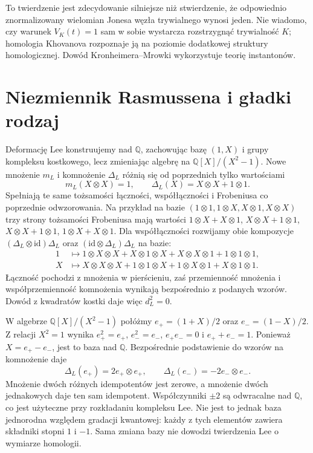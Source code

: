 \begin{uwaga}
To twierdzenie jest zdecydowanie silniejsze niż
stwierdzenie, że odpowiednio znormalizowany wielomian
Jonesa węzła trywialnego wynosi jeden. Nie wiadomo,
czy warunek $V_K(t)=1$ sam w sobie wystarcza
rozstrzygnąć trywialność $K$; homologia Khovanova
rozpoznaje ją na poziomie dodatkowej struktury homologicznej.
Dowód Kronheimera--Mrowki wykorzystuje teorię instantonów.
\end{uwaga}

\section{Niezmiennik Rasmussena i gładki rodzaj}
\label{sec:kt-rasmussen}

Deformację Lee konstruujemy nad $\mathbb Q$, zachowując
bazę $(1,X)$ i grupy kompleksu kostkowego, lecz zmieniając
algebrę na $\mathbb Q[X]/(X^2-1)$. Nowe mnożenie
$m_L$ i komnożenie $\Delta_L$ różnią się od poprzednich
tylko wartościami
\[
 m_L(X\otimes X)=1,\qquad
 \Delta_L(X)=X\otimes X+1\otimes1.
\]
Spełniają te same tożsamości łączności,
współłączności i Frobeniusa co poprzednie
odwzorowania. Na przykład na bazie
$(1\otimes1,1\otimes X,X\otimes1,X\otimes X)$
trzy strony tożsamości Frobeniusa mają wartości
$1\otimes X+X\otimes1$, $X\otimes X+1\otimes1$,
$X\otimes X+1\otimes1$, $1\otimes X+X\otimes1$.
Dla współłączności rozwijamy obie kompozycje
$(\Delta_L\otimes\mathrm{id})\Delta_L$ oraz
$(\mathrm{id}\otimes\Delta_L)\Delta_L$ na bazie:
\[
\begin{aligned}
1&\longmapsto 1\otimes X\otimes X+
 X\otimes1\otimes X+X\otimes X\otimes1+
 1\otimes1\otimes1,\\
X&\longmapsto X\otimes X\otimes X+
 1\otimes1\otimes X+1\otimes X\otimes1+
 X\otimes1\otimes1.
\end{aligned}
\]
Łączność pochodzi z mnożenia w pierścieniu, zaś
przemienność mnożenia i współprzemienność komnożenia
wynikają bezpośrednio z podanych wzorów.
Dowód z kwadratów kostki daje więc $d_L^2=0$.

\begin{uwaga}
\label{rem:kt-lee-idempotents}
W algebrze $\mathbb Q[X]/(X^2-1)$ połóżmy
$e_+=(1+X)/2$ oraz $e_-=(1-X)/2$.
Z relacji $X^2=1$ wynika
$e_+^2=e_+$, $e_-^2=e_-$, $e_+e_-=0$
i $e_++e_-=1$. Ponieważ $X=e_+-e_-$,
jest to baza nad $\mathbb Q$. Bezpośrednie podstawienie
do wzorów na komnożenie daje
\[
 \Delta_L(e_+)=2e_+\otimes e_+,\qquad
 \Delta_L(e_-)=-2e_-\otimes e_-.
\]
Mnożenie dwóch różnych idempotentów jest zerowe,
a mnożenie dwóch jednakowych daje ten sam idempotent.
Współczynniki $\pm2$ są odwracalne nad $\mathbb Q$,
co jest użyteczne przy rozkładaniu kompleksu Lee.
Nie jest to jednak baza jednorodna względem gradacji
kwantowej: każdy z tych elementów zawiera składniki
stopni $1$ i $-1$. Sama zmiana bazy nie dowodzi
twierdzenia Lee o wymiarze homologii.
\end{uwaga}

